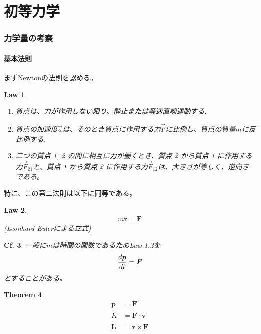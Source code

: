 \documentclass[dvipdfmx]{jsarticle}
\begin{document}
\newtheorem{law}{Law}[section]
\newtheorem{theo}[law]{Theorem}
\newtheorem{lemm}[law]{Lemma}
\newtheorem{cor}[law]{Corollary}
\newtheorem{defi}[law]{Definition}
\newtheorem{cf}[law]{Cf.}

\part{初等力学}

\section{力学量の考察}

\subsection{基本法則}
まずNewtonの法則を認める。
\begin{law} \mbox{}\\
\begin{enumerate}
\item 質点は、力が作用しない限り、静止または等速直線運動する. \\
\item 質点の加速度$ {\displaystyle {\vec {a}}} $は、そのとき質点に作用する力$ {\displaystyle {\vec {F}}} $に比例し、質点の質量$ {\displaystyle {m}} $に反比例する. \\
\item 二つの質点 1, 2 の間に相互に力が働くとき、質点 2 から質点 1 に作用する力$ {\displaystyle {{\vec {F}}_{21}}} $と、質点 1 から質点 2 に作用する力$ {\displaystyle {\vec {F}}_{12}} $は、大きさが等しく、逆向きである。
\end{enumerate}
\end{law}
特に、この第二法則は以下に同等である。
\begin{law}
\begin{align*}
m \ddot{\bm{r}} = \bm{F}
\end{align*}
(Leonhard Eulerによる立式)
\end{law}

\begin{cf}
一般に$m$は時間の関数であるためLaw 1.2を
\[
\frac{d\bm{p}}{dt} = \bm{F} \\
\]
とすることがある。
\end{cf}

\begin{theo}
\begin{align*}
\bm{\dot{p}} &= \bm{F} \tag{1.1} \\
\dot{K} &= \bm{F} \cdot \bm{v} \tag{1.2} \\
\bm{\dot{L}} &= \bm{r} \times \bm{F}\tag{1.3} \\
\end{align*}
\end{theo}
\end{document}
